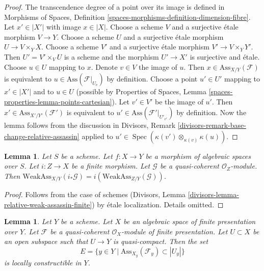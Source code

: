 \documentclass{stacks-project}
\theoremstyle{plain}
\newtheorem{lemma}[subsection]{Lemma}
\theoremstyle{definition}
\theoremstyle{remark}
\numberwithin{equation}{subsection}
\def\Spec{\mathop{\mathrm{Spec}}}
\begin{document}
\begin{proof}
The transcendence degree of a point over its image is defined in
Morphisms of Spaces, Definition
\ref{spaces-morphisms-definition-dimension-fibre}.
Let $x' \in |X'|$ with image $x \in |X|$.
Choose a scheme $V$ and a surjective \'etale morphism $V \to Y$.
Choose a scheme $U$ and a surjective
\'etale morphism $U \to V \times_Y X$. Choose a scheme $V'$
and a surjective \'etale morphism $V' \to V \times_Y Y'$.
Then $U' = V' \times_V U$ is a scheme and the morphism
$U' \to X'$ is surjective and \'etale.
Choose $u \in U$ mapping to $x$.
Denote $v \in V$ the image of $u$.
Then $x \in \text{Ass}_{X/Y}(\mathcal{F})$ is
equivalent to $u \in \text{Ass}(\mathcal{F}|_{U_v})$
by definition. Choose a point $u' \in U'$ mapping
to $x' \in |X'|$ and to $u \in U$ (possible by
Properties of Spaces, Lemma \ref{spaces-properties-lemma-points-cartesian}).
Let $v' \in V'$ be the image of $u'$.
Then $x' \in \text{Ass}_{X'/Y'}(\mathcal{F}')$ is
equivalent to $u' \in \text{Ass}(\mathcal{F}'|_{U'_{v'}})$
by definition.
Now the lemma follows from the discussion in
Divisors, Remark \ref{divisors-remark-base-change-relative-assassin}
applied to $u' \in \Spec(\kappa(v') \otimes_{\kappa(v)} \kappa(u))$.
\end{proof}

\begin{lemma}
\label{lemma-relative-weak-assassin-finite}
Let $S$ be a scheme.
Let $f : X \to Y$ be a morphism of algebraic spaces over $S$.
Let $i : Z \to X$ be a finite morphism.
Let $\mathcal{G}$ be a quasi-coherent $\mathcal{O}_Z$-module.
Then $\text{WeakAss}_{X/Y}(i_*\mathcal{G}) =
i(\text{WeakAss}_{Z/Y}(\mathcal{G}))$.
\end{lemma}

\begin{proof}
Follows from the case of schemes
(Divisors, Lemma \ref{divisors-lemma-relative-weak-assassin-finite})
by \'etale localization. Details omitted.
\end{proof}

\begin{lemma}
\label{lemma-relative-assassin-constructible}
Let $Y$ be a scheme. Let $X$ be an algebraic space of finite presentation
over $Y$. Let $\mathcal{F}$ be a quasi-coherent $\mathcal{O}_X$-module
of finite presentation. Let $U \subset X$ be an open subspace
such that $U \to Y$ is quasi-compact. Then the set
$$
E = \{y \in Y \mid \text{Ass}_{X_y}(\mathcal{F}_y) \subset |U_y|\}
$$
is locally constructible in $Y$.
\end{lemma}
\end{document}
